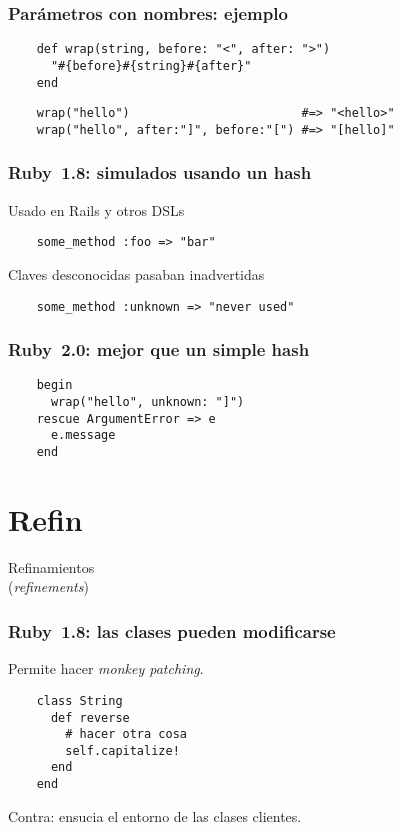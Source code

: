 \documentclass[compress]{beamer}
\begin{document}
\begin{frame}[fragile]
\frametitle{Parámetros con nombres: ejemplo}
	\begin{lstlisting}
	def wrap(string, before: "<", after: ">")
	  "#{before}#{string}#{after}"
	end
	\end{lstlisting}

	\lstset{language=bash}
	\begin{lstlisting}
	wrap("hello")                        #=> "<hello>"
	wrap("hello", after:"]", before:"[") #=> "[hello]"
	\end{lstlisting}

\end{frame}


\begin{frame}[fragile]
\frametitle{Ruby~1.8: simulados usando un hash}
	Usado en Rails y otros DSLs
	\begin{lstlisting}
	some_method :foo => "bar"
	\end{lstlisting}
	
	Claves desconocidas pasaban inadvertidas
	\begin{lstlisting}
	some_method :unknown => "never used"
	\end{lstlisting}
\end{frame}


\begin{frame}[fragile]
\frametitle{Ruby~2.0: mejor que un simple hash}
	\begin{lstlisting}
	begin
	  wrap("hello", unknown: "]")
	rescue ArgumentError => e
	  e.message
	end
	\end{lstlisting}
\end{frame}


\section{Refin}

\begin{frame}
	\begin{center}
		Refinamientos\\
		(\emph{refinements})
	\end{center}
\end{frame}


\begin{frame}[fragile]
\frametitle{Ruby~1.8: las clases pueden modificarse}
	Permite hacer \emph{monkey patching}.
	\begin{lstlisting}
	class String
	  def reverse
	    # hacer otra cosa
	    self.capitalize!
	  end
	end
	\end{lstlisting}
	Contra: ensucia el entorno de las clases clientes.
\end{frame}
\end{document}

